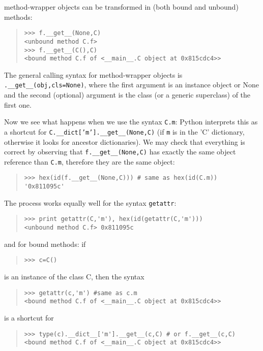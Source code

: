 \documentclass[10pt,english]{article}
\begin{document}
method-wrapper objects can be transformed in (both bound and unbound) methods:
\begin{quote}
\begin{verbatim}>>> f.__get__(None,C)
<unbound method C.f>
>>> f.__get__(C(),C)
<bound method C.f of <__main__.C object at 0x815cdc4>>\end{verbatim}
\end{quote}

The general calling syntax for method-wrapper objects is 
\texttt{.{\_}{\_}get{\_}{\_}(obj,cls=None)}, where the first argument is an
instance object or None and the second (optional) argument is the class (or a
generic superclass) of the first one.

Now we see what happens when we use the syntax \texttt{C.m}: Python interprets
this as a shortcut for \texttt{C.{\_}{\_}dict['m'].{\_}{\_}get{\_}{\_}(None,C)} (if \texttt{m} is
in the 'C' dictionary, otherwise it looks for ancestor dictionaries). 
We may check that everything is correct by observing that
\texttt{f.{\_}{\_}get{\_}{\_}(None,C)} has exactly the same object reference than \texttt{C.m},
therefore they are the same object:
\begin{quote}
\begin{verbatim}>>> hex(id(f.__get__(None,C))) # same as hex(id(C.m))
'0x811095c'\end{verbatim}
\end{quote}

The process works equally well for the syntax \texttt{getattr}:
\begin{quote}
\begin{verbatim}>>> print getattr(C,'m'), hex(id(getattr(C,'m')))
<unbound method C.f> 0x811095c\end{verbatim}
\end{quote}

and for bound methods: if
\begin{quote}
\begin{verbatim}>>> c=C()\end{verbatim}
\end{quote}

is an instance of the class C, then the syntax
\begin{quote}
\begin{verbatim}>>> getattr(c,'m') #same as c.m
<bound method C.f of <__main__.C object at 0x815cdc4>>\end{verbatim}
\end{quote}

is a shortcut for
\begin{quote}
\begin{verbatim}>>> type(c).__dict__['m'].__get__(c,C) # or f.__get__(c,C)
<bound method C.f of <__main__.C object at 0x815cdc4>>\end{verbatim}
\end{quote}
\end{document}
